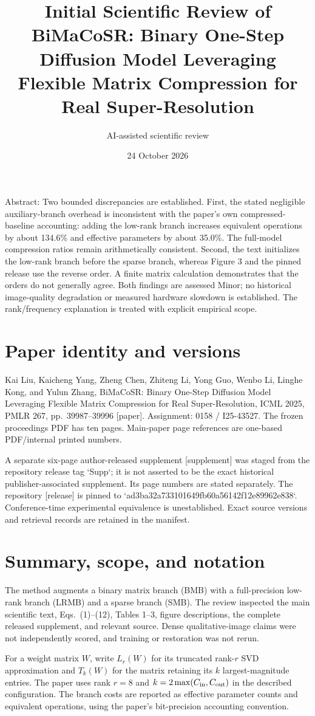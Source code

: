 \documentclass[10pt]{article}
\title{Initial Scientific Review of
BiMaCoSR: Binary One-Step Diffusion Model Leveraging Flexible Matrix Compression for Real Super-Resolution}
\author{AI-assisted scientific review}
\date{24 October 2026}
\begin{document}
\maketitle
Abstract: Two bounded discrepancies are established. First, the stated negligible auxiliary-branch overhead is inconsistent with the paper’s own compressed-baseline accounting: adding the low-rank branch increases equivalent operations by about 134.6\% and effective parameters by about 35.0\%. The full-model compression ratios remain arithmetically consistent. Second, the text initializes the low-rank branch before the sparse branch, whereas Figure 3 and the pinned release use the reverse order. A finite matrix calculation demonstrates that the orders do not generally agree. Both findings are assessed Minor; no historical image-quality degradation or measured hardware slowdown is established. The rank/frequency explanation is treated with explicit empirical scope.\par
\section*{Paper identity and versions}
Kai Liu, Kaicheng Yang, Zheng Chen, Zhiteng Li, Yong Guo, Wenbo Li, Linghe Kong, and Yulun Zhang, BiMaCoSR: Binary One-Step Diffusion Model Leveraging Flexible Matrix Compression for Real Super-Resolution, ICML 2025, PMLR 267, pp. 39987–39996 [paper]. Assignment: 0158 / I25-43527. The frozen proceedings PDF has ten pages. Main-paper page references are one-based PDF/internal printed numbers.\par
A separate six-page author-released supplement [supplement] was staged from the repository release tag `Supp`; it is not asserted to be the exact historical publisher-associated supplement. Its page numbers are stated separately. The repository [release] is pinned to `ad3ba32a733101649fb60a56142f12e89962e838`. Conference-time experimental equivalence is unestablished. Exact source versions and retrieval records are retained in the manifest.\par
\section*{Summary, scope, and notation}
The method augments a binary matrix branch (BMB) with a full-precision low-rank branch (LRMB) and a sparse branch (SMB). The review inspected the main scientific text, Eqs. (1)–(12), Tables 1–3, figure descriptions, the complete released supplement, and relevant source. Dense qualitative-image claims were not independently scored, and training or restoration was not rerun.\par
For a weight matrix \(W\), write \(L_r(W)\) for its truncated rank-\(r\) SVD approximation and \(T_k(W)\) for the matrix retaining its \(k\) largest-magnitude entries. The paper uses rank \(r=8\) and \(k=2\max(C_{\rm in},C_{\rm out})\) in the described configuration. The branch costs are reported as effective parameter counts and equivalent operations, using the paper’s bit-precision accounting convention.\par
\end{document}
